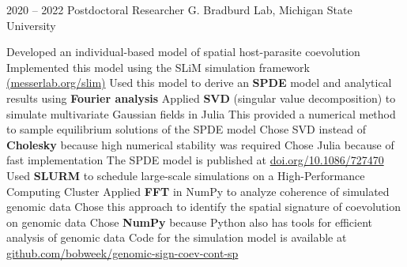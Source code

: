 \documentclass[9pt]{developercv} %
\begin{document}
\begin{entrylist}
{\begin{outline}[itemize]
                \end{outline}}
               \entry
               {2020 -- 2022}
               {Postdoctoral Researcher}
               {G. Bradburd Lab, Michigan State University}
               {\vspace{-10 pt}\begin{outline}[itemize]
                    \1 Developed an individual-based model of spatial host-parasite coevolution
                        \vspace{-6 pt} \2[$\cdot$] Implemented this model using the SLiM simulation framework \href{https://messerlab.org/slim/}{\footnotesize{(messerlab.org/slim)}}
                        \vspace{-3 pt} \2[$\cdot$] Used this model to derive an \textbf{SPDE} model and analytical results using \textbf{Fourier analysis}
                        \vspace{-6 pt} \1 Applied \textbf{SVD} (singular value decomposition) to simulate multivariate Gaussian fields in Julia
                        \vspace{-6 pt}\2[$\cdot$] This provided a numerical method to sample equilibrium solutions of the SPDE model 
                        \vspace{-3 pt}\2[$\cdot$] Chose SVD instead of \textbf{Cholesky} because high numerical stability was required
                        \vspace{-3 pt}\2[$\cdot$] Chose Julia because of fast implementation
                    \vspace{-6 pt} \1 The SPDE model is published at \href{https://doi.org/10.1086/727470}{\footnotesize{doi.org/10.1086/727470}}
                    \vspace{-6 pt} \1 Used \textbf{SLURM} to schedule large-scale simulations on a High-Performance Computing Cluster
                    \vspace{-6 pt}\1 Applied \textbf{FFT} in NumPy to analyze coherence of simulated genomic data
                        \vspace{-6 pt} \2[$\cdot$] Chose this approach to identify the spatial signature of coevolution on genomic data
                        \vspace{-3 pt} \2[$\cdot$] Chose \textbf{NumPy} because Python also has tools for efficient analysis of genomic data
                    \vspace{-6 pt} \1 Code for the simulation model is available at \href{https://github.com/bobweek/genomic-sign-coev-cont-sp}{\footnotesize{github.com/bobweek/genomic-sign-coev-cont-sp}}

\end{outline}}
\end{entrylist}
\end{document}
